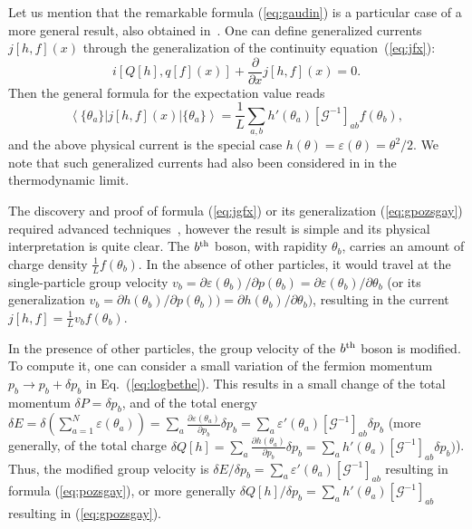 \documentclass[onecolumn,amsfonts,showpacs,superscriptaddress]{revtex4-1}
\begin{document}
Let us mention that the remarkable formula (\ref{eq:gaudin}) is a particular case of a more general result, also obtained in~\citep{borsi2020current,pozsgay2020algebraic,pozsgay2020current}. One can define generalized currents $j[h,f](x)$ through the generalization of the continuity equation~(\ref{eq:jfx}):
\begin{equation}
    \label{eq:jgfx}
    i \left[ Q[h] , q[f](x) \right]  + \frac{\partial}{\partial x} j[h,f](x) = 0 .
\end{equation}
Then the general formula for the expectation value reads
\begin{equation}
    \label{eq:gpozsgay}
 \left< \{ \theta_a \} \right|  j [h,f](x)  \left| \{ \theta_a \} \right> = \frac{1}{L} \sum_{a,b} h' (\theta_a)  [\mathcal{G}^{-1}]_{ab}  f (\theta_b) ,
\end{equation}
and the above physical current is the special case $h(\theta) = \varepsilon(\theta)= \theta^2/2$. We note that such generalized currents had also been considered in \citep{castro2016emergent} in the thermodynamic limit.



The discovery and proof of formula (\ref{eq:jgfx}) or its generalization (\ref{eq:gpozsgay}) required advanced techniques~\citep{borsi2020current,pozsgay2020algebraic,pozsgay2020current}, however the result is simple and its physical interpretation is quite clear. The $b^{\rm th}$ boson, with rapidity $\theta_b$, carries an amount of charge density $\frac{1}{L} f(\theta_b)$. In the absence of other particles, it would travel at the single-particle group velocity $v_b = \partial \varepsilon(\theta_b)/ \partial p (\theta_b) = \partial \varepsilon(\theta_b)/ \partial \theta_b$ (or its generalization $v_b = \partial h(\theta_b)/ \partial p (\theta_b)) = \partial h(\theta_b)/ \partial \theta_b)$, resulting in the current $j[h,f] = \frac{1}{L} v_b f(\theta_b) $.

In the presence of other particles, the group velocity of the $b^{\rm th}$ boson is modified. To compute it, one can consider a small variation of the fermion momentum $p_b \rightarrow p_b + \delta p_b$ in Eq.~(\ref{eq:logbethe}). This results in a small change of the total momentum $\delta P = \delta p_b$, and of the total energy $\delta E = \delta \left( \sum_{a=1}^N \varepsilon(\theta_a) \right) = \sum_{a} \frac{\partial \varepsilon(\theta_a) }{\partial p_b} \delta p_b = \sum_{a} \varepsilon'(\theta_a) [\mathcal{G}^{-1}]_{ab} \delta p_b$ (more generally, of the total charge $\delta Q[h] =  \sum_{a} \frac{\partial h(\theta_a) }{\partial p_b} \delta p_b = \sum_{a} h'(\theta_a) [\mathcal{G}^{-1}]_{ab} \delta p_b)$). Thus, the modified group velocity is $\delta E/\delta p_b = \sum_{a} \varepsilon'(\theta_a) [\mathcal{G}^{-1}]_{ab}$ resulting in formula (\ref{eq:pozsgay}), or more generally $\delta Q[h]/\delta p_b = \sum_{a} h'(\theta_a) [\mathcal{G}^{-1}]_{ab}$ resulting in (\ref{eq:gpozsgay}).
\end{document}
